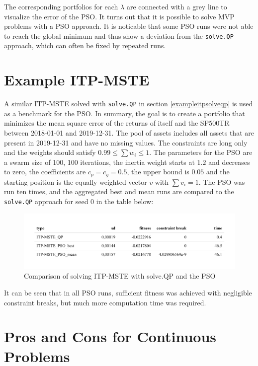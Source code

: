 \documentclass[
  oneside, a4paper, 12pt, openany]{book}
\theoremstyle{definition}
\theoremstyle{definition}
\theoremstyle{definition}
\theoremstyle{definition}
\theoremstyle{remark}
\begin{document}
The corresponding portfolios for each \(\lambda\) are connected with a grey line to visualize the error of the PSO. It turns out that it is possible to solve MVP problems with a PSO approach. It is noticable that some PSO runs were not able to reach the global minimum and thus show a deviation from the \texttt{solve.QP} approach, which can often be fixed by repeated runs.

\hypertarget{example-itp-mste}{%
\section{Example ITP-MSTE}\label{example-itp-mste}}

A similar ITP-MSTE solved with \texttt{solve.QP} in section \ref{exampleitpsolveqp} is used as a benchmark for the PSO. In summary, the goal is to create a portfolio that minimizes the mean square error of the returns of itself and the SP500TR between 2018-01-01 and 2019-12-31. The pool of assets includes all assets that are present in 2019-12-31 and have no missing values. The constraints are long only and the weights should satisfy \(0.99 \leq \textstyle\sum w_i \leq 1\). The parameters for the PSO are a swarm size of 100, 100 iterations, the inertia weight starts at \(1.2\) and decreases to zero, the coefficients are \(c_p=c_g=0.5\), the upper bound is \(0.05\) and the starting position is the equally weighted vector \(v\) with \(\textstyle\sum v_i=1\). The PSO was run ten times, and the aggregated best and mean runs are compared to the \texttt{solve.QP} approach for seed 0 in the table below:

\begin{figure}[H]
\includegraphics{Master_Thesis_files/figure-latex/pso8-1} \caption{Comparison of solving ITP-MSTE with solve.QP and the PSO}\label{fig:pso8}
\end{figure}

It can be seen that in all PSO runs, sufficient fitness was achieved with negligible constraint breaks, but much more computation time was required.

\hypertarget{pros-and-cons-for-continuous-problems}{%
\section{Pros and Cons for Continuous Problems}\label{pros-and-cons-for-continuous-problems}}
\end{document}
